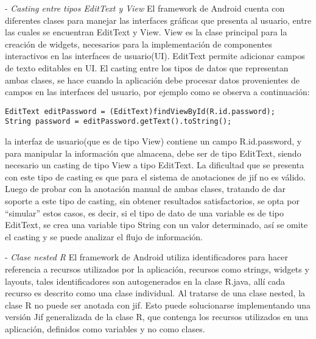 - \textit{Casting entre tipos EditText y View}\newline
El framework de Android cuenta con diferentes clases para manejar las interfaces
gráficas que presenta al usuario, entre las cuales se encuentran EditText y
View. View es la clase principal para la creación de widgets, necesarios para la
implementación de componentes interactivos en las interfaces de usuario(UI).
EditText permite adicionar campos de texto editables en UI. El casting entre los
tipos de datos que representan ambas clases, se hace cuando la aplicación debe
procesar datos provenientes de campos en las interfaces del usuario, por ejemplo
como se observa a continuación:
\begin{lstlisting}
EditText editPassword = (EditText)findViewById(R.id.password);
String password = editPassword.getText().toString();
\end{lstlisting}
la interfaz de usuario(que es de tipo View) contiene un campo R.id.password, y
para manipular la información que almacena, debe ser de tipo EditText, siendo
necesario un casting de tipo View a tipo EditText. La dificultad que se presenta
con este tipo de casting es que para el sistema de anotaciones de jif no es
válido. Luego de probar con la anotación manual de ambas clases, tratando de
dar soporte a este tipo de casting, sin obtener resultados satisfactorios, se
opta por ``simular'' estos casos, es decir, si el tipo de dato de una variable
es de tipo EditText, se crea una variable tipo String con un valor determinado,
así se omite el casting y se puede analizar el flujo de información.

- \textit{Clase nested R}\newline
El framework de Android utiliza identificadores para hacer referencia a recursos
utilizados por la aplicación, recursos como strings, widgets y layouts, tales
identificadores son autogenerados en la clase R.java, allí cada recurso es
descrito como una clase individual. Al tratarse de una clase nested, la clase R
no puede ser anotada con jif. Esto puede solucionarse implementando una
versión Jif generalizada de la clase R, que contenga los recursos utilizados en
una aplicación, definidos como variables y no como clases.


